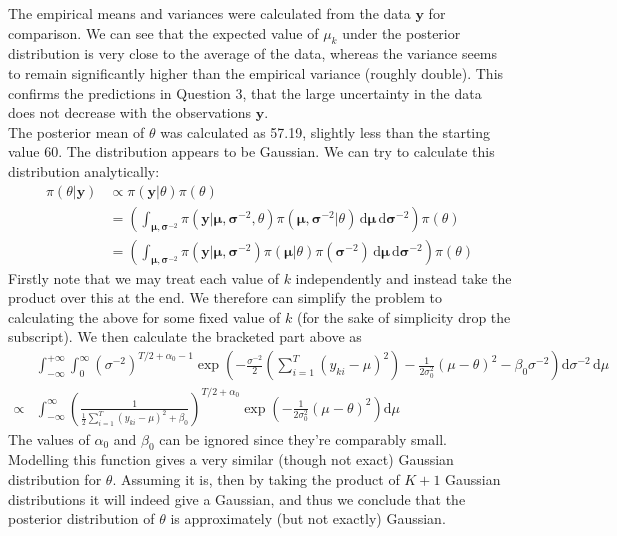 \documentclass[10pt,a4paper,notitlepage]{article}
\newcommand{\y}{\mathbf{y}}
\begin{document}
The empirical means and variances were calculated from the data $\y$ for comparison. We can see that the expected value of $\mu_{k}$ under the posterior distribution is very close to the average of the data, whereas the variance seems to remain significantly higher than the empirical variance (roughly double). This confirms the predictions in Question 3, that the large uncertainty in the data does not decrease with the observations $\y$.\\

The posterior mean of $\theta$ was calculated as 57.19, slightly less than the starting value 60. The distribution appears to be Gaussian. We can try to calculate this distribution analytically: 
\begin{equation}
\begin{aligned}
\pi(\theta|\y) &\propto \pi(\y|\theta)\pi(\theta)\\
&=\left(\int_{\bm{\mu},\bm{\sigma}^{-2}}\pi(\y|\bm{\mu},\bm{\sigma}^{-2},\theta)\pi(\bm{\mu},\bm{\sigma}^{-2}|\theta)\,\text{d}\bm{\mu}\,\text{d}\bm{\sigma}^{-2}\right)\pi(\theta)\\
&=\left(\int_{\bm{\mu},\bm{\sigma}^{-2}}\pi(\y|\bm{\mu},\bm{\sigma}^{-2})\pi(\bm{\mu}|\theta)\pi(\bm{\sigma}^{-2})\,\text{d}\bm{\mu}\,\text{d}\bm{\sigma}^{-2}\right)\pi(\theta)
\end{aligned}
\end{equation}
Firstly note that we may treat each value of $k$ independently and instead take the product over this at the end. We therefore can simplify the problem to calculating the above for some fixed value of $k$ (for the sake of simplicity drop the subscript).  We then calculate the bracketed part above as
\begin{equation}
\begin{aligned}
&\int_{-\infty}^{+\infty}\int_{0}^{\infty}\left(\sigma^{-2}\right)^{T/2+\alpha_{0}-1}\exp\left(-\frac{\sigma^{-2}}{2}\left(\sum_{i=1}^{T}\left(y_{ki}-\mu\right)^{2}\right)-\frac{1}{2\sigma_{0}^{2}}\left(\mu-\theta\right)^{2}-\beta_{0}\sigma^{-2}\right)\text{d}\sigma^{-2}\,\text{d}\mu\\
\propto &\int_{-\infty}^{\infty}\left(\frac{1}{\frac{1}{2}\sum_{i=1}^{T}\left(y_{ki}-\mu\right)^{2}+\beta_{0}}\right)^{T/2+\alpha_{0}}\exp\left(-\frac{1}{2\sigma_{0}^{2}}\left(\mu-\theta\right)^{2}\right)\text{d}\mu
\end{aligned}
\end{equation}
The values of $\alpha_{0}$ and $\beta_{0}$ can be ignored since they're comparably small. Modelling this function gives a very similar (though not exact) Gaussian distribution for $\theta$. Assuming it is, then by taking the product of $K+1$ Gaussian distributions it will indeed give a Gaussian,  and thus we conclude that the posterior distribution of $\theta$ is approximately (but not exactly) Gaussian.
\end{document}
